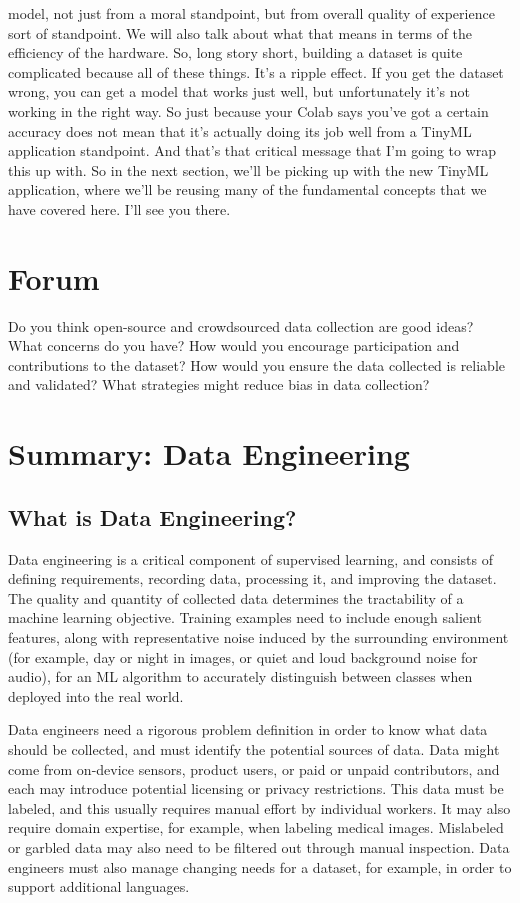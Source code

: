 model, not just from a moral standpoint, but from overall quality of experience
sort of standpoint.
We will also talk about what that means in terms
of the efficiency of the hardware.
So, long story short, building a dataset is quite complicated
because all of these things.
It's a ripple effect.
If you get the dataset wrong, you can get a model that works just well,
but unfortunately it's not working in the right way.
So just because your Colab says you've got
a certain accuracy does not mean that it's actually doing its job well
from a TinyML application standpoint.
And that's that critical message that I'm going to wrap this up with.
So in the next section, we'll be picking up with the new TinyML application,
where we'll be reusing many of the fundamental concepts
that we have covered here.
I'll see you there.

\section{Forum}

Do you think open-source and crowdsourced data collection are good ideas? What concerns do you have? How would you encourage participation and contributions to the dataset? How would you ensure the data collected is reliable and validated? What strategies might reduce bias in data collection?

\section{Summary: Data Engineering}


\subsection{What is Data Engineering?}

Data engineering is a critical component of supervised learning, and consists of defining requirements, recording data, processing it, and improving the dataset. The quality and quantity of collected data determines the tractability of a machine learning objective. Training examples need to include enough salient features, along with representative noise induced by the surrounding environment (for example, day or night in images, or quiet and loud background noise for audio), for an ML algorithm to accurately distinguish between classes when deployed into the real world.
    
    Data engineers need a rigorous problem definition in order to know what data should be collected, and must identify the potential sources of data. Data might come from on-device sensors, product users, or paid or unpaid contributors, and each may introduce potential licensing or privacy restrictions. This data must be labeled, and this usually requires manual effort by individual workers. It may also require domain expertise, for example, when labeling medical images. Mislabeled or garbled data may also need to be filtered out through manual inspection. Data engineers must also manage changing needs for a dataset, for example, in order to support additional languages.
    
